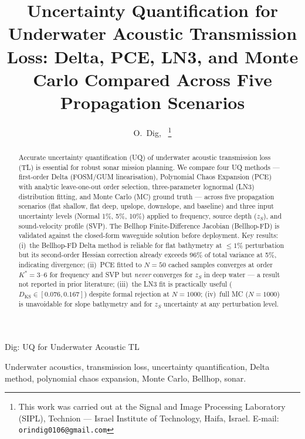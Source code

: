 \documentclass[journal,10pt,twoside]{IEEEtran}
\begin{document}

\title{Uncertainty Quantification for Underwater Acoustic
       Transmission Loss: Delta, PCE, LN3, and Monte Carlo
       Compared Across Five Propagation Scenarios}

\author{O.~Dig,~
\thanks{This work was carried out at the Signal and Image Processing Laboratory
(SIPL), Technion --- Israel Institute of Technology, Haifa, Israel.
E-mail: \texttt{orindig0106@gmail.com}}}

%
{Dig: UQ for Underwater Acoustic TL}

\maketitle

\begin{abstract}
Accurate uncertainty quantification (UQ) of underwater acoustic transmission
loss (TL) is essential for robust sonar mission planning.
We compare four UQ methods --- first-order Delta (FOSM/GUM linearisation),
Polynomial Chaos Expansion (PCE) with analytic leave-one-out order selection,
three-parameter lognormal (LN3) distribution fitting, and Monte Carlo (MC)
ground truth --- across five propagation scenarios (flat shallow, flat deep,
upslope, downslope, and baseline) and three input uncertainty levels (Normal
1\%, 5\%, 10\%) applied to frequency, source depth ($z_S$), and sound-velocity
profile (SVP).
The Bellhop Finite-Difference Jacobian (Bellhop-FD) is validated against the
closed-form waveguide solution before deployment.
Key results: (i)~the Bellhop-FD Delta method is reliable for flat bathymetry
at $\leq1\%$ perturbation but its second-order Hessian correction already
exceeds 96\% of total variance at 5\%, indicating divergence;
(ii)~PCE fitted to $N{=}50$ cached samples converges at order $K^*{=}3$--6
for frequency and SVP but \emph{never} converges for $z_S$ in deep water ---
a result not reported in prior literature;
(iii)~the LN3 fit is practically useful ($D_\mathrm{KS} \in [0.076, 0.167]$)
despite formal rejection at $N{=}1000$;
(iv)~full MC ($N{=}1000$) is unavoidable for slope bathymetry and for $z_S$
uncertainty at any perturbation level.
\end{abstract}

\begin{IEEEkeywords}
Underwater acoustics, transmission loss, uncertainty quantification,
Delta method, polynomial chaos expansion, Monte Carlo, Bellhop, sonar.
\end{IEEEkeywords}
\end{document}
